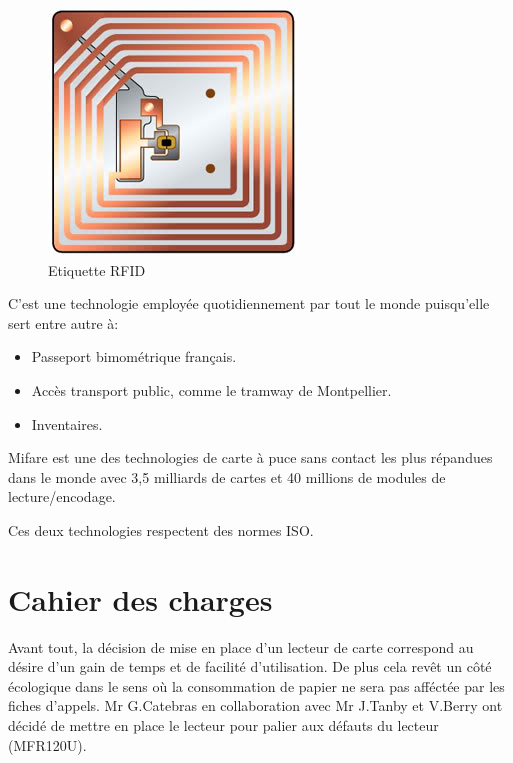     \begin{figure}[h]
        \begin{center}
            \includegraphics[scale=0.6]{RFIDtag.jpg} 
        \end{center}

        \caption{Etiquette RFID}
        \label{Etiquette RFID}
    \end{figure}


C'est une technologie employée quotidiennement par tout le monde puisqu'elle
sert entre autre à:

\begin{itemize}
\item Passeport bimométrique français.
\item Accès transport public, comme le tramway de Montpellier.
\item Inventaires.
\end{itemize}

Mifare est une des technologies de carte à puce sans contact les plus répandues
dans le monde avec 3,5 milliards de cartes et 40 millions de modules de lecture/encodage.

Ces deux technologies respectent des normes ISO.

\section{Cahier des charges}
Avant tout, la décision de mise en place d'un lecteur de carte correspond au désire d'un gain 
de temps et de facilité d'utilisation. De plus cela revêt un côté écologique dans le sens 
où la consommation de papier ne sera pas afféctée par les fiches d'appels. Mr G.Catebras en 
collaboration avec Mr J.Tanby et V.Berry ont décidé de mettre en place le lecteur pour palier aux
 défauts du lecteur (MFR120U).\newline
